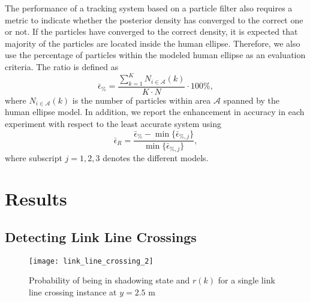 \documentclass[journal, 10pt, twocolumn, balance]{IEEEtran}
\begin{document}
The performance of a tracking system based on a particle filter also requires a metric to indicate whether the posterior density has converged to the correct one or not. If the particles have converged to the correct density, it is expected that majority of the particles are located inside the human ellipse. Therefore, we also use the percentage of particles within the modeled human ellipse as an evaluation criteria. The ratio is defined as 
\begin{equation} \label{eq:ratio}
	\bar{\epsilon}_\% = \frac{ \sum_{k=1}^K N_{i \in \mathcal{A}}(k)}{K \cdot N} \cdot 100 \%,
\end{equation}
where $N_{i \in \mathcal{A}}(k)$ is the number of particles within area $\mathcal{A}$ spanned by the human ellipse model. In addition, we report the enhancement in accuracy in each experiment with respect to the least accurate system using 
\begin{equation} \label{eq:enhancement}
\bar{\epsilon}_R  = \frac{ \bar{\epsilon}_{\%} - \min \lbrace\bar{\epsilon}_{\%,j}\rbrace}{ \min \lbrace\bar{\epsilon}_{\%,j}\rbrace },
\end{equation}
where subscript $j = 1,2,3$ denotes the different models. 



\section{Results} \label{S:results}
\subsection{Detecting Link Line Crossings}\label{sec:link_crossing_results}

\begin{figure}[!t]
\begin{centering}
\texttt{[image: link\_line\_crossing\_2]}
\caption{Probability of being in shadowing state and $r(k)$ for a single link line crossing instance at $y = 2.5 \text{ m}$} 
\label{fig:hmm_state_estimate}
\end{centering}
\end{figure}
\end{document}
